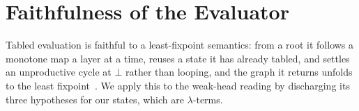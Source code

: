 \fi %

\ifColambdaBody


\fi

\ifColambdaAppendix
\appendix

\section{Faithfulness of the Evaluator}\label{app:faithful}
Tabled evaluation is faithful to a least-fixpoint semantics: from a root it follows a monotone map a layer at a time, reuses a state it has already tabled, and settles an unproductive cycle at $\bot$ rather than looping, and the graph it returns unfolds to the least fixpoint~\cite{vanemden-kowalski, tamaki-sato, tabling-slg}. We apply this to the weak-head reading by discharging its three hypotheses for our states, which are $\lambda$-terms.

